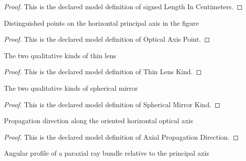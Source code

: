 \begin{proof}
  This is the declared model definition of signed Length In Centimeters.
\end{proof}
\begin{definition}
  \label{def:physics:phyx-mini-0076:phyxminiproblems-problemphyxmini0076-opticalaxispoint}
  Distinguished points on the horizontal principal axis in the figure
\end{definition}
\begin{proof}
  This is the declared model definition of Optical Axis Point.
\end{proof}
\begin{definition}
  \label{def:physics:phyx-mini-0076:phyxminiproblems-problemphyxmini0076-thinlenskind}
  The two qualitative kinds of thin lens
\end{definition}
\begin{proof}
  This is the declared model definition of Thin Lens Kind.
\end{proof}
\begin{definition}
  \label{def:physics:phyx-mini-0076:phyxminiproblems-problemphyxmini0076-sphericalmirrorkind}
  The two qualitative kinds of spherical mirror
\end{definition}
\begin{proof}
  This is the declared model definition of Spherical Mirror Kind.
\end{proof}
\begin{definition}
  \label{def:physics:phyx-mini-0076:phyxminiproblems-problemphyxmini0076-axialpropagationdirection}
  Propagation direction along the oriented horizontal optical axis
\end{definition}
\begin{proof}
  This is the declared model definition of Axial Propagation Direction.
\end{proof}
\begin{definition}
  \label{def:physics:phyx-mini-0076:phyxminiproblems-problemphyxmini0076-raybundleprofile}
  Angular profile of a paraxial ray bundle relative to the principal axis
\end{definition}
